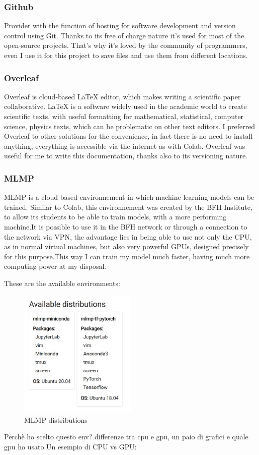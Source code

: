 \subsubsection{Github}
Provider with the function of hosting for software development and version control using Git.
Thanks to its free of charge nature it's used for most of the open-source projects.
That's why it's loved by the community of programmers, even I use it for this project to save files and use them from different locations.


\subsubsection{Overleaf}
Overleaf is cloud-based \LaTeX{} editor, which makes writing a scientific paper collaborative. \LaTeX{} is a software widely used in the academic world to create scientific texts, with useful formatting for mathematical, statistical, computer science, physics texts, which can be problematic on other text editors.
I preferred Overleaf to other solutions for the convenience, in fact there is no need to install anything, everything is accessible via the internet as with Colab.
Overleaf was useful for me to write this documentation, thanks also to its versioning nature.

\subsubsection{MLMP}
MLMP is a cloud-based environnement in which machine learning models can be trained. Similar to Colab, this environnement was created by the BFH Institute, to allow its students to be able to train models, with a more performing machine.It is possible to use it in the BFH network or through a connection to the network via VPN, the advantage lies in being able to use not only the CPU, as in normal virtual machines, but also very powerful GPUs, designed precisely for this purpose.This way I can train my model much faster, having much more computing power at my disposal.

These are the available environments:
\begin{figure}[ht!]
\centering
\includegraphics[width=0.5\textwidth]{images/bfhmlmp.jpg}
\caption{MLMP distributions}
\label{fig:fig_02}
\end{figure}
\FloatBarrier
Perchè ho scelto questo env?
differenze tra cpu e gpu, un paio di grafici e quale gpu ho usato
Un esempio di CPU vs GPU:

